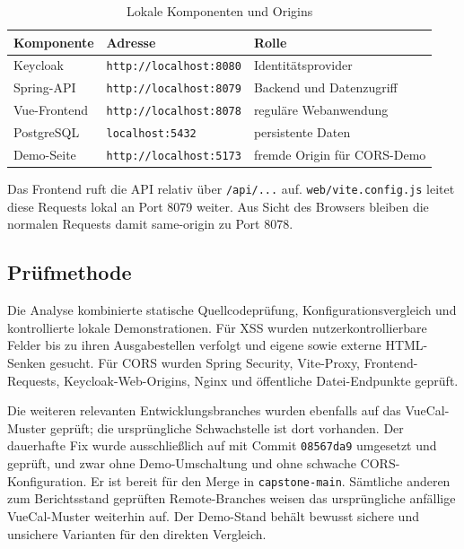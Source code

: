 \begin{table}[H]
  \centering
  \caption{Lokale Komponenten und Origins}
  \begin{tabular}{lll}
    \toprule
    \textbf{Komponente} & \textbf{Adresse} & \textbf{Rolle}\\
    \midrule
    Keycloak & \texttt{http://localhost:8080} & Identitätsprovider\\
    Spring-API & \texttt{http://localhost:8079} & Backend und Datenzugriff\\
    Vue-Frontend & \texttt{http://localhost:8078} & reguläre Webanwendung\\
    PostgreSQL & \texttt{localhost:5432} & persistente Daten\\
    Demo-Seite & \texttt{http://localhost:5173} & fremde Origin für CORS-Demo\\
    \bottomrule
  \end{tabular}
\end{table}

Das Frontend ruft die API relativ über \texttt{/api/...} auf.
\texttt{web/vite.config.js} leitet diese Requests lokal an Port 8079
weiter. Aus Sicht des Browsers bleiben die normalen Requests damit
same-origin zu Port 8078.

\subsection{Prüfmethode}

Die Analyse kombinierte statische Quellcodeprüfung,
Konfigurationsvergleich und kontrollierte lokale Demonstrationen. Für
XSS wurden nutzerkontrollierbare Felder bis zu ihren Ausgabestellen
verfolgt und eigene sowie externe HTML-Senken gesucht. Für CORS
wurden Spring Security, Vite-Proxy, Frontend-Requests,
Keycloak-Web-Origins, Nginx und öffentliche Datei-Endpunkte geprüft.

Die weiteren relevanten Entwicklungsbranches wurden ebenfalls auf das
VueCal-Muster geprüft; die ursprüngliche Schwachstelle ist dort
vorhanden. Der dauerhafte Fix wurde ausschließlich auf
 mit Commit \texttt{08567da9}
umgesetzt und geprüft, und zwar ohne Demo-Umschaltung und ohne schwache
CORS-Konfiguration. Er ist bereit für den Merge in
\texttt{capstone-main}. Sämtliche anderen zum Berichtsstand geprüften
Remote-Branches weisen das ursprüngliche anfällige VueCal-Muster
weiterhin auf. Der Demo-Stand
 behält bewusst sichere und
unsichere Varianten für den direkten Vergleich.
